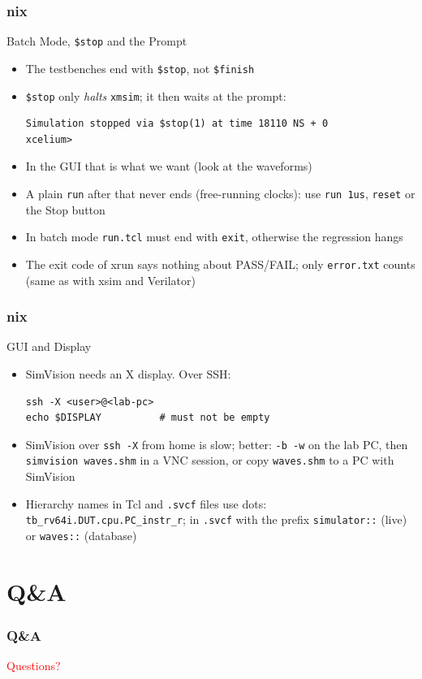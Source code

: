 \documentclass{beamer}
\newcommand{\astitle}{nix}
\newcommand{\assubtitle}{nix}
\newcommand{\cmd}[1]{\texttt{#1}}
\begin{document}
\renewcommand{\assubtitle}{Batch Mode, \texttt{\$stop} and the Prompt}
\begin{frame}[fragile]
\frametitle{\astitle}
\begin{block}{\assubtitle}
  \begin{itemize}
    \item The testbenches end with \cmd{\$stop}, not \cmd{\$finish}
    \item \cmd{\$stop} only \emph{halts} \cmd{xmsim}; it then waits at the prompt:
\begin{lstlisting}
Simulation stopped via $stop(1) at time 18110 NS + 0
xcelium>
\end{lstlisting}
    \item In the GUI that is what we want (look at the waveforms)
    \item A plain \cmd{run} after that never ends (free-running clocks):
      use \cmd{run 1us}, \cmd{reset} or the Stop button
    \item In batch mode \cmd{run.tcl} must end with \cmd{exit},
      otherwise the regression hangs
    \item The exit code of xrun says nothing about PASS/FAIL;
      only \cmd{error.txt} counts (same as with xsim and Verilator)
  \end{itemize}
\end{block}
\end{frame}

\renewcommand{\assubtitle}{GUI and Display}
\begin{frame}[fragile]
\frametitle{\astitle}
\begin{block}{\assubtitle}
  \begin{itemize}
    \item SimVision needs an X display. Over SSH:
\begin{lstlisting}[style=sh]
ssh -X <user>@<lab-pc>
echo $DISPLAY          # must not be empty
\end{lstlisting}
    \item SimVision over \cmd{ssh -X} from home is slow; better:
      \cmd{-b -w} on the lab PC, then \cmd{simvision waves.shm}
      in a VNC session, or copy \cmd{waves.shm} to a PC with SimVision
    \item Hierarchy names in Tcl and \cmd{.svcf} files use dots:
      \cmd{tb\_rv64i.DUT.cpu.PC\_instr\_r}; in \cmd{.svcf} with the prefix
      \cmd{simulator::} (live) or \cmd{waves::} (database)
  \end{itemize}
\end{block}
\end{frame}

\section{Q\&A}
\renewcommand{\astitle}{Q\&A}
\begin{frame}
\frametitle{\astitle}
\vfill
\centering
\begin{Huge}\textcolor{red}{Questions?}\end{Huge}
\vfill
\end{frame}
\end{document}
